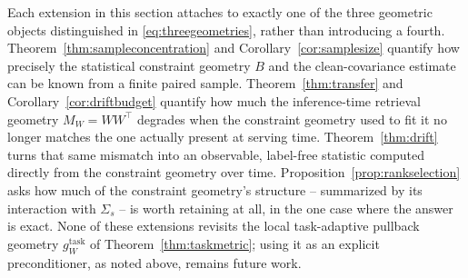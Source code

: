 Each extension in this section attaches to exactly one of the three
geometric objects distinguished in \cref{eq:threegeometries}, rather than
introducing a fourth. Theorem~\ref{thm:sampleconcentration} and
Corollary~\ref{cor:samplesize} quantify how precisely the statistical
constraint geometry $B$ and the clean-covariance estimate can be known from
a finite paired sample. Theorem~\ref{thm:transfer} and
Corollary~\ref{cor:driftbudget} quantify how much the inference-time
retrieval geometry $M_W=WW^\top$ degrades when the constraint geometry used
to fit it no longer matches the one actually present at serving time.
Theorem~\ref{thm:drift} turns that same mismatch into an observable,
label-free statistic computed directly from the constraint geometry over
time. Proposition~\ref{prop:rankselection} asks how much of the constraint
geometry's structure -- summarized by its interaction with $\Sigma_s$ -- is
worth retaining at all, in the one case where the answer is exact. None of
these extensions revisits the local task-adaptive pullback geometry
$g_W^{\mathrm{task}}$ of Theorem~\ref{thm:taskmetric}; using it as an
explicit preconditioner, as noted above, remains future work.
